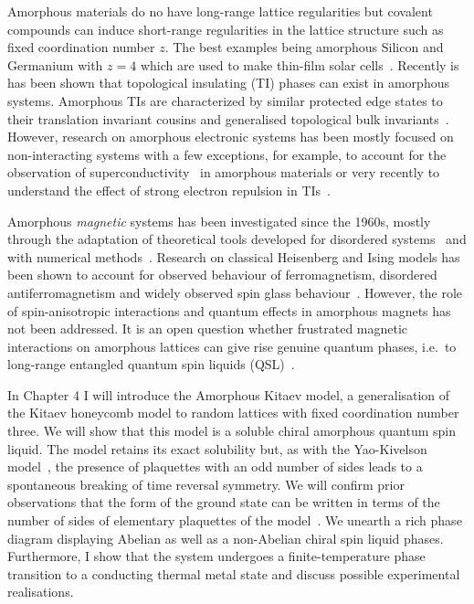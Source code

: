 Amorphous materials do no have long-range lattice regularities but covalent compounds can induce short-range regularities in the lattice structure such as fixed coordination number \(z\). The best examples being amorphous Silicon and Germanium with \(z=4\) which are used to make thin-film solar cells~\autocite{Weaire1971,betteridge1973possible}. Recently is has been shown that topological insulating (TI) phases can exist in amorphous systems. Amorphous TIs are characterized by similar protected edge states to their translation invariant cousins and generalised topological bulk invariants~\autocite{mitchellAmorphousTopologicalInsulators2018,agarwala2019topological,marsalTopologicalWeaireThorpeModels2020,costa2019toward,agarwala2020higher,spring2021amorphous,corbae2019evidence}. However, research on amorphous electronic systems has been mostly focused on non-interacting systems with a few exceptions, for example, to account for the observation of superconductivity~\autocite{buckel1954einfluss,mcmillan1981electron,meisel1981eliashberg,bergmann1976amorphous,mannaNoncrystallineTopologicalSuperconductors2022} in amorphous materials or very recently to understand the effect of strong electron repulsion in TIs~\autocite{kim2022fractionalization}.

Amorphous \emph{magnetic} systems has been investigated since the 1960s, mostly through the adaptation of theoretical tools developed for disordered systems~\autocite{aharony1975critical,Petrakovski1981,kaneyoshi1992introduction,Kaneyoshi2018} and with numerical methods~\autocite{fahnle1984monte,plascak2000ising}. Research on classical Heisenberg and Ising models has been shown to account for observed behaviour of ferromagnetism, disordered antiferromagnetism and widely observed spin glass behaviour~\autocite{coey1978amorphous}. However, the role of spin-anisotropic interactions and quantum effects in amorphous magnets has not been addressed. It is an open question whether frustrated magnetic interactions on amorphous lattices can give rise genuine quantum phases, i.e.~to long-range entangled quantum spin liquids (QSL)~\autocite{Anderson1973,Knolle2019,Savary2016,Lacroix2011}.

In Chapter 4 I will introduce the Amorphous Kitaev model, a generalisation of the Kitaev honeycomb model to random lattices with fixed coordination number three. We will show that this model is a soluble chiral amorphous quantum spin liquid. The model retains its exact solubility but, as with the Yao-Kivelson model~\autocite{yaoExactChiralSpin2007}, the presence of plaquettes with an odd number of sides leads to a spontaneous breaking of time reversal symmetry. We will confirm prior observations that the form of the ground state can be written in terms of the number of sides of elementary plaquettes of the model~\autocite{OBrienPRB2016,eschmannThermodynamicClassificationThreedimensional2020}. We unearth a rich phase diagram displaying Abelian as well as a non-Abelian chiral spin liquid phases. Furthermore, I show that the system undergoes a finite-temperature phase transition to a conducting thermal metal state and discuss possible experimental realisations.

